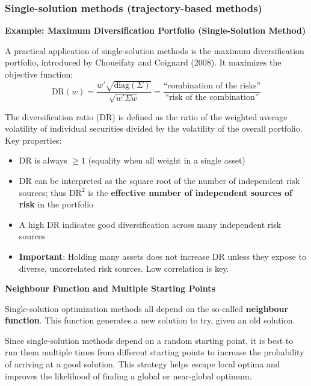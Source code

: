 \documentclass[12pt,a4paper]{article}
\begin{document}
\subsubsection{Single-solution methods (trajectory-based methods)}

\textbf{Example: Maximum Diversification Portfolio (Single-Solution Method)}

A practical application of single-solution methods is the maximum diversification portfolio, introduced by Choueifaty and Coignard (2008). It maximizes the objective function:
\[
\text{DR}(w) = \frac{w' \sqrt{\text{diag}(\Sigma)}}{\sqrt{w' \Sigma w}} = \frac{\text{``combination of the risks''}}{\text{``risk of the combination''}}
\]

The diversification ratio (DR) is defined as the ratio of the weighted average volatility of individual securities divided by the volatility of the overall portfolio. Key properties:

\begin{itemize}
    \item DR is always $\geq 1$ (equality when all weight in a single asset)
    \item DR can be interpreted as the square root of the number of independent risk sources; thus $\text{DR}^2$ is the \textbf{effective number of independent sources of risk} in the portfolio
    \item A high DR indicates good diversification across many independent risk sources
    \item \textbf{Important}: Holding many assets does not increase DR unless they expose to diverse, uncorrelated risk sources. Low correlation is key.
\end{itemize}

\vspace{0.5em}

\textbf{Neighbour Function and Multiple Starting Points}

Single-solution optimization methods all depend on the so-called \textbf{neighbour function}. This function generates a new solution to try, given an old solution.

Since single-solution methods depend on a random starting point, it is best to run them multiple times from different starting points to increase the probability of arriving at a good solution. This strategy helps escape local optima and improves the likelihood of finding a global or near-global optimum.

\vspace{0.5em}
\end{document}

